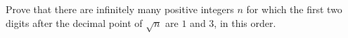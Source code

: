 Prove that there are infinitely many positive integers $n$ for which the first two digits after the decimal point of $\sqrt n$ are $1$ and $3$, in this order.
